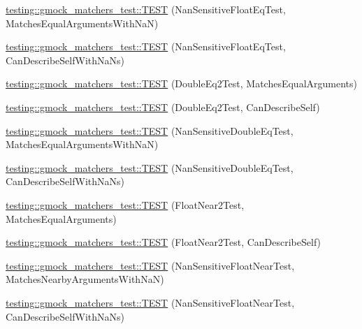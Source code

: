 \begin{DoxyCompactItemize}
\item 
\mbox{\hyperlink{namespacetesting_1_1gmock__matchers__test_ae79a1197b9700a9c3299d5d6773bae60}{testing\+::gmock\+\_\+matchers\+\_\+test\+::\+T\+E\+ST}} (Nan\+Sensitive\+Float\+Eq\+Test, Matches\+Equal\+Arguments\+With\+NaN)
\item 
\mbox{\hyperlink{namespacetesting_1_1gmock__matchers__test_acb2db40a51cacb3640e9e53550f22a05}{testing\+::gmock\+\_\+matchers\+\_\+test\+::\+T\+E\+ST}} (Nan\+Sensitive\+Float\+Eq\+Test, Can\+Describe\+Self\+With\+Na\+Ns)
\item 
\mbox{\hyperlink{namespacetesting_1_1gmock__matchers__test_ac5d042ac79e58a41118a7c025df84265}{testing\+::gmock\+\_\+matchers\+\_\+test\+::\+T\+E\+ST}} (Double\+Eq2\+Test, Matches\+Equal\+Arguments)
\item 
\mbox{\hyperlink{namespacetesting_1_1gmock__matchers__test_aca0555b5646f5553e131d98fd311bde6}{testing\+::gmock\+\_\+matchers\+\_\+test\+::\+T\+E\+ST}} (Double\+Eq2\+Test, Can\+Describe\+Self)
\item 
\mbox{\hyperlink{namespacetesting_1_1gmock__matchers__test_ac3c08325efc35d2ce3a779082e133c68}{testing\+::gmock\+\_\+matchers\+\_\+test\+::\+T\+E\+ST}} (Nan\+Sensitive\+Double\+Eq\+Test, Matches\+Equal\+Arguments\+With\+NaN)
\item 
\mbox{\hyperlink{namespacetesting_1_1gmock__matchers__test_a7f3c0b8340e424a6a41f7a0a00072791}{testing\+::gmock\+\_\+matchers\+\_\+test\+::\+T\+E\+ST}} (Nan\+Sensitive\+Double\+Eq\+Test, Can\+Describe\+Self\+With\+Na\+Ns)
\item 
\mbox{\hyperlink{namespacetesting_1_1gmock__matchers__test_aff4b9c79cf64ea0348be61ced3fdf1d2}{testing\+::gmock\+\_\+matchers\+\_\+test\+::\+T\+E\+ST}} (Float\+Near2\+Test, Matches\+Equal\+Arguments)
\item 
\mbox{\hyperlink{namespacetesting_1_1gmock__matchers__test_af9cf6709254ef2df314b8989abd0327f}{testing\+::gmock\+\_\+matchers\+\_\+test\+::\+T\+E\+ST}} (Float\+Near2\+Test, Can\+Describe\+Self)
\item 
\mbox{\hyperlink{namespacetesting_1_1gmock__matchers__test_a120a3f5e18772202f60c2b32ae0bc6b3}{testing\+::gmock\+\_\+matchers\+\_\+test\+::\+T\+E\+ST}} (Nan\+Sensitive\+Float\+Near\+Test, Matches\+Nearby\+Arguments\+With\+NaN)
\item 
\mbox{\hyperlink{namespacetesting_1_1gmock__matchers__test_a7d029a5d7ca6bc503227f7c34a5e20e2}{testing\+::gmock\+\_\+matchers\+\_\+test\+::\+T\+E\+ST}} (Nan\+Sensitive\+Float\+Near\+Test, Can\+Describe\+Self\+With\+Na\+Ns)
\item 

\end{DoxyCompactItemize}
